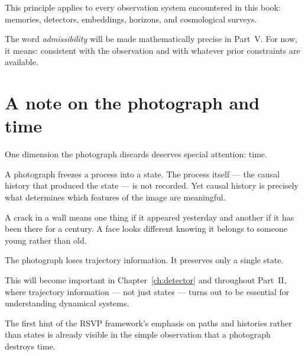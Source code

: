 
This principle applies to every observation system encountered in
this book: memories, detectors, embeddings, horizons, and
cosmological surveys.

The word \emph{admissibility} will be made mathematically precise
in Part~V\@.
For now, it means: consistent with the observation and with
whatever prior constraints are available.

\section{A note on the photograph and time}

One dimension the photograph discards deserves special attention:
time.

A photograph freezes a process into a state.
The process itself --- the causal history that produced the state
--- is not recorded.
Yet causal history is precisely what determines which features of
the image are meaningful.

A crack in a wall means one thing if it appeared yesterday and
another if it has been there for a century.
A face looks different knowing it belongs to someone young rather
than old.

The photograph loses trajectory information.
It preserves only a single state.

This will become important in Chapter~\ref{ch:detector} and
throughout Part~II, where trajectory information --- not just
states --- turns out to be essential for understanding dynamical
systems.

The first hint of the RSVP framework's emphasis on paths and
histories rather than states is already visible in the simple
observation that a photograph destroys time.
